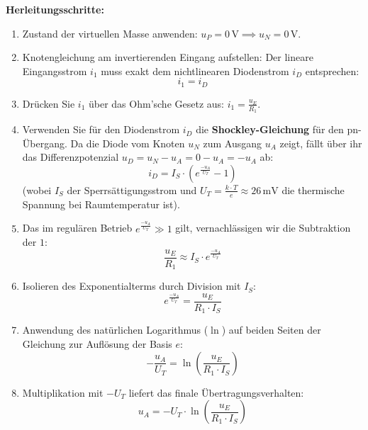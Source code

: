 \documentclass[11pt,a4paper]{article}
\begin{document}
\textbf{Herleitungsschritte:}
\begin{enumerate}
    \item Zustand der virtuellen Masse anwenden: $u_P = 0\,\text{V} \implies u_N = 0\,\text{V}$.
    \item Knotengleichung am invertierenden Eingang aufstellen: Der lineare Eingangsstrom $i_1$ muss exakt dem nichtlinearen Diodenstrom $i_D$ entsprechen:
    \begin{equation}
    i_1 = i_D
    \end{equation}
    \item Drücken Sie $i_1$ über das Ohm'sche Gesetz aus: $i_1 = \frac{u_E}{R_1}$.
    \item Verwenden Sie für den Diodenstrom $i_D$ die \textbf{Shockley-Gleichung} für den pn-Übergang. Da die Diode vom Knoten $u_N$ zum Ausgang $u_A$ zeigt, fällt über ihr das Differenzpotenzial $u_D = u_N - u_A = 0 - u_A = -u_A$ ab:
    \begin{equation}
    i_D = I_S \cdot \left( e^{\frac{-u_A}{U_T}} - 1 \right)
    \end{equation}
    (wobei $I_S$ der Sperrsättigungsstrom und $U_T = \frac{k \cdot T}{e} \approx 26\,\text{mV}$ die thermische Spannung bei Raumtemperatur ist).
    \item Das im regulären Betrieb $e^{\frac{-u_A}{U_T}} \gg 1$ gilt, vernachlässigen wir die Subtraktion der $1$:
    \begin{equation}
    \frac{u_E}{R_1} \approx I_S \cdot e^{\frac{-u_A}{U_T}}
    \end{equation}
    \item Isolieren des Exponentialterms durch Division mit $I_S$:
    \begin{equation}
    e^{\frac{-u_A}{U_T}} = \frac{u_E}{R_1 \cdot I_S}
    \end{equation}
    \item Anwendung des natürlichen Logarithmus ($\ln$) auf beiden Seiten der Gleichung zur Auflösung der Basis $e$:
    \begin{equation}
    -\frac{u_A}{U_T} = \ln\left( \frac{u_E}{R_1 \cdot I_S} \right)
    \end{equation}
    \item Multiplikation mit $-U_T$ liefert das finale Übertragungsverhalten:
    \begin{equation}
    u_A = -U_T \cdot \ln\left( \frac{u_E}{R_1 \cdot I_S} \right)
    \end{equation}
\end{enumerate}
\end{document}
